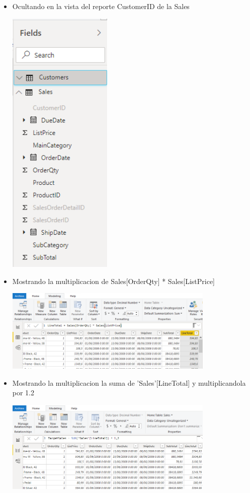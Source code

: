\begin{itemize}
	\item  Ocultando en la vista del reporte CustomerID de la Sales
	\begin{center}
	\includegraphics[width=5cm]{./Imagenes/Captura2-11} 
	\end{center}
\end{itemize} 
\begin{itemize}
	\item  Mostrando la multiplicacion de Sales[OrderQty] * Sales[ListPrice]
	\begin{center}
	\includegraphics[width=10cm]{./Imagenes/Captura2-12} 
	\end{center}
\end{itemize} 
\begin{itemize}
	\item  Mostrando la multiplicacion la suma de 'Sales'[LineTotal] y multiplicandola por 1.2
	\begin{center}
	\includegraphics[width=10cm]{./Imagenes/Captura2-13} 
	\end{center}
\end{itemize} 
